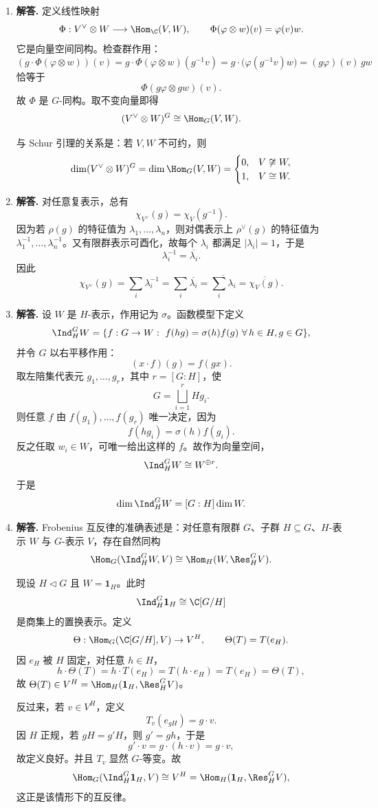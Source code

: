 \begin{enumerate}[label=\textbf{\arabic*.}, leftmargin=*, itemsep=1em]
\item \textbf{解答.} 定义线性映射
\[
\Phi:V^\vee\otimes W\longrightarrow \Hom_\C(V,W),\qquad
\Phi(\varphi\otimes w)(v)=\varphi(v)w.
\]
它是向量空间同构。检查群作用：
\[
(g\cdot \Phi(\varphi\otimes w))(v)
=g\cdot \Phi(\varphi\otimes w)(g^{-1}v)
=g\cdot \bigl(\varphi(g^{-1}v)w\bigr)
=(g\varphi)(v)\,gw
\]
恰等于
\[
\Phi(g\varphi\otimes gw)(v).
\]
故 $\Phi$ 是 $G$-同构。取不变向量即得
\[
(V^\vee\otimes W)^G\cong \Hom_G(V,W).
\]

与 Schur 引理的关系是：若 $V,W$ 不可约，则
\[
\dim (V^\vee\otimes W)^G=\dim\Hom_G(V,W)=
\begin{cases}
0,& V\not\cong W,\\
1,& V\cong W.
\end{cases}
\]

\item \textbf{解答.} 对任意复表示，总有
\[
\chi_{V^\vee}(g)=\chi_V(g^{-1}).
\]
因为若 $\rho(g)$ 的特征值为 $\lambda_1,\dots,\lambda_n$，则对偶表示上 $\rho^\vee(g)$ 的特征值为 $\lambda_1^{-1},\dots,\lambda_n^{-1}$。又有限群表示可酉化，故每个 $\lambda_i$ 都满足 $|\lambda_i|=1$，于是
\[
\lambda_i^{-1}=\overline{\lambda_i}.
\]
因此
\[
\chi_{V^\vee}(g)=\sum_i\lambda_i^{-1}
=\sum_i\overline{\lambda_i}
=\overline{\sum_i\lambda_i}
=\overline{\chi_V(g)}.
\]

\item \textbf{解答.} 设 $W$ 是 $H$-表示，作用记为 $\sigma$。函数模型下定义
\[
\Ind_H^G W
=\{f:G\to W:\ f(hg)=\sigma(h)f(g)\ \forall\,h\in H,g\in G\},
\]
并令 $G$ 以右平移作用：
\[
(x\cdot f)(g)=f(gx).
\]
取左陪集代表元 $g_1,\dots,g_r$，其中 $r=[G:H]$，使
\[
G=\bigsqcup_{i=1}^r Hg_i.
\]
则任意 $f$ 由 $f(g_1),\dots,f(g_r)$ 唯一决定，因为
\[
f(hg_i)=\sigma(h)f(g_i).
\]
反之任取 $w_i\in W$，可唯一给出这样的 $f$。故作为向量空间，
\[
\Ind_H^G W\cong W^{\oplus r}.
\]
于是
\[
\dim \Ind_H^G W=[G:H]\dim W.
\]

\item \textbf{解答.} Frobenius 互反律的准确表述是：对任意有限群 $G$、子群 $H\subseteq G$、$H$-表示 $W$ 与 $G$-表示 $V$，存在自然同构
\[
\Hom_G(\Ind_H^G W,V)\cong \Hom_H(W,\Res_H^G V).
\]

现设 $H\triangleleft G$ 且 $W=\mathbf1_H$。此时
\[
\Ind_H^G\mathbf1_H
\cong \C[G/H]
\]
是商集上的置换表示。定义
\[
\Theta:\Hom_G(\C[G/H],V)\to V^H,\qquad \Theta(T)=T(e_H).
\]
因 $e_H$ 被 $H$ 固定，对任意 $h\in H$，
\[
h\cdot \Theta(T)=h\cdot T(e_H)=T(h\cdot e_H)=T(e_H)=\Theta(T),
\]
故 $\Theta(T)\in V^H=\Hom_H(\mathbf1_H,\Res_H^G V)$。

反过来，若 $v\in V^H$，定义
\[
T_v(e_{gH})=g\cdot v.
\]
因 $H$ 正规，若 $gH=g'H$，则 $g'=gh$，于是
\[
g'\cdot v=g\cdot(h\cdot v)=g\cdot v,
\]
故定义良好。并且 $T_v$ 显然 $G$-等变。故
\[
\Hom_G(\Ind_H^G\mathbf1_H,V)\cong V^H
=\Hom_H(\mathbf1_H,\Res_H^G V),
\]
这正是该情形下的互反律。


\end{enumerate}
